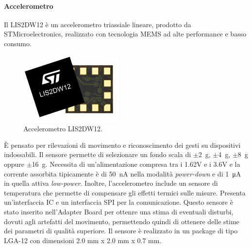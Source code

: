 \paragraph{Accelerometro} Il LIS2DW12 è un accelerometro triassiale lineare, prodotto da STMicroelectronics\cite{STElectronicsLIS2DW12}, realizzato con tecnologia MEMS ad alte performance e basso consumo. 
\begin{figure}[b]
	\centering
	\includegraphics[width=0.3\linewidth]{ImageFiles/Hardware/ImmagineLIS2DW12}
	\caption{Accelerometro LIS2DW12.}
	\label{fig:ImmagineLIS2DW12}
\end{figure}
\`E pensato per rilevazioni di movimento e riconoscimento dei gesti su dispositivi indossabili. Il sensore permette di selezionare un fondo scala di $\pm$\SI{2}{\gram}, $\pm$\SI{4}{\gram}, $\pm$\SI{8}{\gram} oppure $\pm$\SI{16}{\gram}. Necessita di un'alimentazione compresa tra i 1.62V e i 3.6V e la corrente assorbita tipicamente è di \SI{50}{\nano\ampere} nella modalità \textit{power-down} e di \SI{1}{\micro\ampere} in quella attiva \textit{low-power}. Inoltre, l'accelerometro include un sensore di temperatura che permette di compensare gli effetti termici sulle misure. Presenta un'interfaccia IC e un interfaccia SPI per la comunicazione. Questo sensore è stato inserito nell'Adapter Board per ottenre una stima di eventuali disturbi, dovuti agli artefatti del movimento, permettendo quindi di ottenere delle stime dei parametri di qualità superiore. Il sensore è realizzato in un package di tipo LGA-12 con dimensioni 2.0 mm x 2.0 mm x 0.7 mm.

